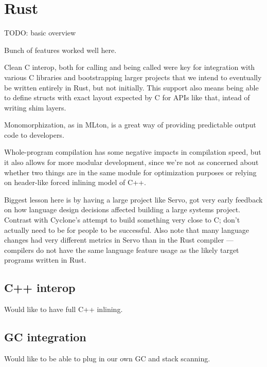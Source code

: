 
\section{Rust}
\label{sec:rust}

TODO: basic overview

Bunch of features worked well here.

Clean C interop, both for calling and being called were key for integration with various C libraries and bootstrapping larger projects that we intend to eventually be written entirely in Rust, but not initially. This support also means being able to define structs with exact layout expected by C for APIs like that, intead of writing shim layers.

Monomorphization, as in MLton, is a great way of providing predictable output code to developers.

Whole-program compilation has some negative impacts in compilation speed, but it also allows for more modular development, since we're not as concerned about whether two things are in the same module for optimization purposes or relying on header-like forced inlining model of C++.

Biggest lesson here is by having a large project like Servo, got very early feedback on how language design decisions affected building a large systems project. Contrast with Cyclone's attempt to build something very close to C; don't actually need to be for people to be successful. Also note that many language changes had very different metrics in Servo than in the Rust compiler --- compilers do not have the same language feature usage as the likely target programs written in Rust.

\subsection{C++ interop}
Would like to have full C++ inlining.

\subsection{GC integration}
Would like to be able to plug in our own GC and stack scanning.

